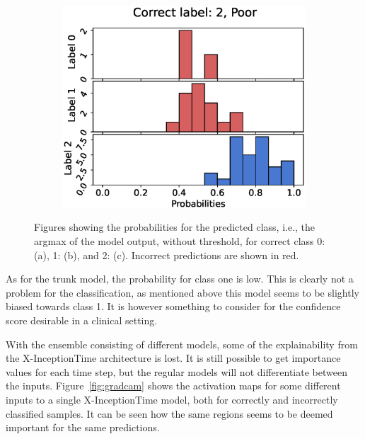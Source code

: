 \begin{figure}
\begin{subfigure}[t]{0.33\textwidth}
  \end{subfigure}%
  \begin{subfigure}[t]{0.33\textwidth}
    \includegraphics[width=\textwidth]{files/figs/res/femval/pc2-rb.eps}
    \caption{}
    \label{fig:femval-pc2}
  \end{subfigure}

  \caption{Figures showing the probabilities for the predicted class, i.e., the argmax of the model output, without threshold, for correct class 0: (a), 1: (b), and 2: (c). Incorrect predictions are shown in red.}
  \label{fig:femval-pc}
\end{figure}

As for the trunk model, the probability for class one is low. This is clearly not a problem for the classification, as mentioned above this model seems to be slightly biased towards class 1. It is however something to consider for the confidence score desirable in a clinical setting.


With the ensemble consisting of different models, some of the explainability from the X-InceptionTime architecture is lost. It is still possible to get importance values for each time step, but the regular models will not differentiate between the inputs. Figure~\ref{fig:gradcam} shows the activation maps for some different inputs to a single X-InceptionTime model, both for correctly and incorrectly classified samples. It can be seen how the same regions seems to be deemed important for the same predictions.%

